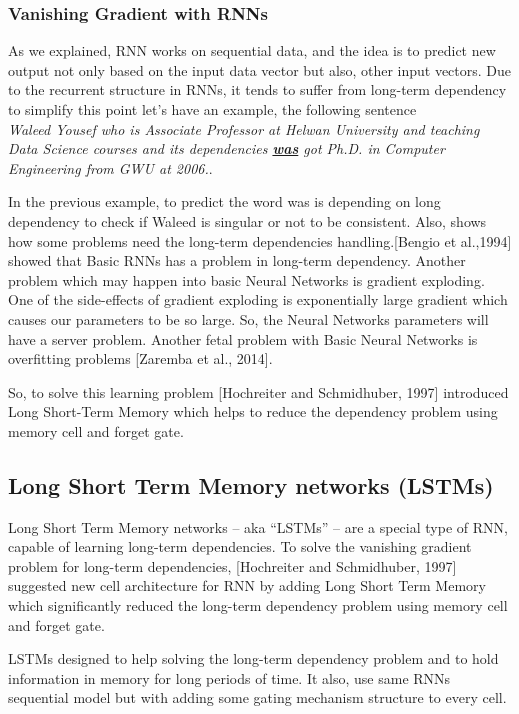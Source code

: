  \subsubsection{Vanishing Gradient with RNNs}\label{sec_RNN_Vanishing}
 
 As we explained, RNN works on sequential data, and the idea is to predict new output not only based on the input data vector but also, other input vectors. Due to the recurrent structure in RNNs, it tends to suffer from long-term dependency to simplify this point let’s have an example, the following sentence \\
 \textit{Waleed Yousef who is Associate Professor at Helwan University and teaching Data Science courses and its dependencies \textbf{\underline{was}} got Ph.D. in Computer Engineering from GWU at 2006.}.

 In the previous example, to predict the word was is depending on long dependency to check if Waleed is singular or not to be consistent. Also, shows how some problems need the long-term dependencies handling.[Bengio et al.,1994]\cite{Bengio_ et_ al} showed that Basic RNNs has a problem in long-term dependency.  Another problem which may happen into basic Neural Networks is gradient exploding. One of the side-effects of gradient exploding is exponentially large gradient which causes our parameters to be so large. So, the Neural Networks parameters will have a server problem. Another fetal problem with Basic Neural Networks is overfitting problems [Zaremba et al., 2014]\cite{Zaremba_et_al}.
 
 So, to solve this learning problem [Hochreiter and Schmidhuber, 1997] introduced Long Short-Term Memory which helps to reduce the dependency problem using memory cell and forget gate.

\subsection{Long Short Term Memory networks (LSTMs)}\label{sec_LSTM}


Long Short Term Memory networks – aka “LSTMs” – are a special type of RNN, capable of learning long-term dependencies. To solve the vanishing gradient problem for long-term dependencies, [Hochreiter and Schmidhuber, 1997]\cite{Hochreiter} suggested new cell architecture for RNN by adding Long Short Term Memory which significantly reduced the long-term dependency problem using memory cell and forget gate.

 LSTMs designed to help solving the long-term dependency problem and to hold information in memory for long periods of time. It also, use same RNNs sequential model but with adding some gating mechanism structure to every cell.

